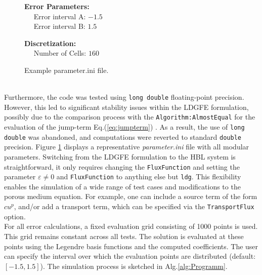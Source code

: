 \documentclass[a4paper,12pt]{paper}
\begin{document}
\begin{figure}[htbp]
{{\begin{minipage}{\textwidth}
\begin{framed}
					\noindent
					\textbf{Error Parameters:} \\
					$\quad$ Error interval A: $-1.5$ \\
					$\quad$ Error interval B: $1.5$
					
					\noindent
					\textbf{Discretization:} \\
					$\quad$ Number of Cells: $160$
				\end{framed}
			\end{minipage}
		}
	}
	\caption{Example parameter.ini file.}
	\label{fig:parameter}
\end{figure}\\
Furthermore, the code was tested using \texttt{long double} floating-point precision. However, this led to significant stability issues within the LDGFE formulation, possibly due to the comparison process with the \texttt{Algorithm:AlmostEqual} for the evaluation of the jump-term Eq.(\ref{eq:jumpterm}) . As a result, the use of \texttt{long double} was abandoned, and computations were reverted to standard \texttt{double} precision. Figure \ref{fig:parameter} displays a representative \textit{parameter.ini} file with all modular parameters. Switching from the LDGFE formulation to the HBL system is straightforward, it only requires changing the \texttt{FluxFunction} and setting the parameter \( \varepsilon \neq 0 \) and \texttt{FluxFunction}  to anything else but \texttt{ldg}. This flexibility enables the simulation of a wide range of test cases and modifications to the porous medium equation. For example, one can include a source term of the form \( cu^p \), and/or add a transport term, which can be specified via the \texttt{TransportFlux} option.\\
For all error calculations, a fixed evaluation grid consisting of 1000 points is used. This grid remains constant across all tests. The solution is evaluated at these points using the Legendre basis functions and the computed coefficients. The user can specify the interval over which the evaluation points are distributed (default: \( [-1.5, 1.5] \)). The simulation process is sketched in Alg.\ref{alg:Programm}.\\
\end{document}
